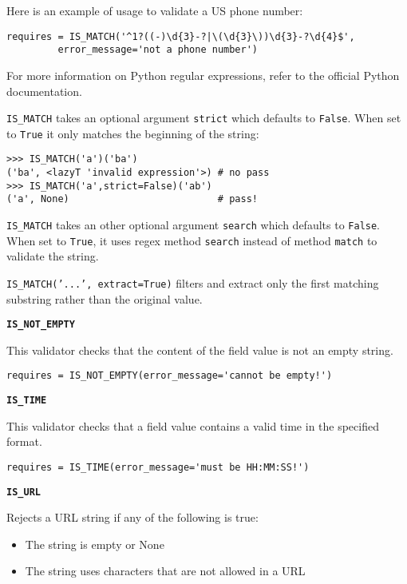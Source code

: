 \documentclass[justified,sixbynine,notoc]{tufte-book}
\def\ft{\small\tt}
\def\inxx#1{\index{#1}}
\begin{document}
\begin{fullwidth}
Here is an example of usage to validate a US phone number:
\begin{lstlisting}
requires = IS_MATCH('^1?((-)\d{3}-?|\(\d{3}\))\d{3}-?\d{4}$',
         error_message='not a phone number')
\end{lstlisting}

For more information on Python regular expressions, refer to the official Python documentation.

{\ft IS\_MATCH} takes an optional argument {\ft strict} which defaults to {\ft False}. When set to {\ft True} it only matches the beginning of the string:

\begin{lstlisting}
>>> IS_MATCH('a')('ba')
('ba', <lazyT 'invalid expression'>) # no pass
>>> IS_MATCH('a',strict=False)('ab')
('a', None)                          # pass!
\end{lstlisting}

{\ft IS\_MATCH} takes an other optional argument {\ft search} which defaults to {\ft False}. When set to {\ft True}, it uses regex method {\ft search} instead of method {\ft match} to validate the string.

{\ft IS\_MATCH('...', extract=True)} filters and extract only the first matching
substring rather than the original value.

{\bf {\ft IS\_NOT\_EMPTY}}

\inxx{IS\_NOT\_EMPTY}

This validator checks that the content of the field value is not an empty string.
\begin{lstlisting}
requires = IS_NOT_EMPTY(error_message='cannot be empty!')
\end{lstlisting}

{\bf {\ft IS\_TIME}}

\inxx{IS\_TIME}

This validator checks that a field value contains a valid time in the specified format.
\begin{lstlisting}
requires = IS_TIME(error_message='must be HH:MM:SS!')
\end{lstlisting}

{\bf {\ft IS\_URL}}

\inxx{IS\_URL}

Rejects a URL string if any of the following is true:
\begin{itemize}
\item The string is empty or None

\item The string uses characters that are not allowed in a URL


\end{itemize}
\end{fullwidth}
\end{document}
